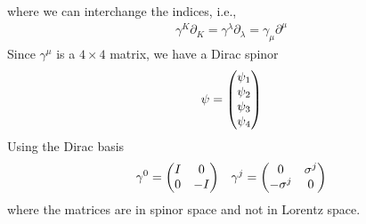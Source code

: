 \documentclass[../main.tex]{subfiles}
\begin{document}
where we can interchange the indices, i.e.,
\begin{align*}
    \gamma^K \partial_K = \gamma^\lambda \partial_\lambda = \gamma_\mu \partial^\mu
\end{align*}
Since $\gamma^\mu$ is a $4\times 4$ matrix, we have a Dirac spinor
\begin{align*}
    \psi = \mqty(\psi_1 \\ \psi_2 \\ \psi_3 \\ \psi_4)
\end{align*}
Using the Dirac basis
\begin{align*}
    \gamma^0 = \mqty(I & 0 \\ 0 & -I) \quad \gamma^j = \mqty(0 & \sigma^j \\ -\sigma^j & 0)
\end{align*}
where the matrices are in spinor space and not in Lorentz space.
\end{document}
